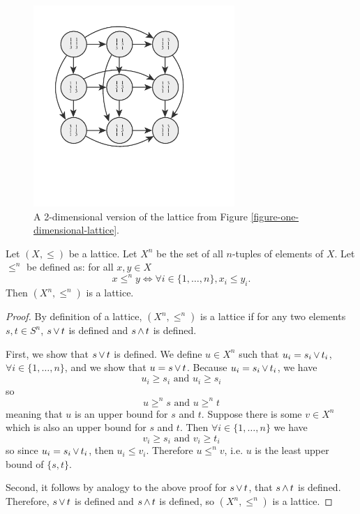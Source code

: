 	\begin{figure}[ht]
		\begin{center}
			\includegraphics[width=3in]{../figures/diagram6.pdf}
			\caption{A 2-dimensional version of the lattice from Figure \ref{figure-one-dimensional-lattice}.}
			\label{figure-two-dimensional-lattice}
		\end{center}
	\end{figure}

	\begin{proposition}
		\label{proposition-grid-is-lattice}
		Let $(X, \le)$ be a lattice. Let $X^n$ be the set of all $n$-tuples of elements of $X$. Let $\le^n$ be defined as: for all $x, y \in X$
		\[
			x \le^n y \iff \forall i \in \{1, \ldots, n\}, x_i \le y_i.
		\]
		Then $(X^n, \le^n)$ is a lattice.
	\end{proposition}

	\begin{proof}
		By definition of a lattice, $(X^n, \le^n)$ is a lattice if for any two elements $s, t \in S^n$, $s \operatorname{\vee} t$ is defined and $s \operatorname{\wedge} t$ is defined.

		First, we show that $s \operatorname{\vee} t$ is defined. We define $u \in X^n$ such that $u_i = s_i \operatorname{\vee} t_i$, $\forall i \in \{1, \ldots, n\}$, and we show that $u = s \operatorname{\vee} t$. Because $u_i = s_i \operatorname{\vee} t_i$, we have
		\[
			u_i \ge s_i \textrm{ and } u_i \ge s_i
		\]
		so
		\[
			u \ge^n s \textrm{ and } u \ge^n t
		\]
		meaning that $u$ is an upper bound for $s$ and $t$. Suppose there is some $v \in X^n$ which is also an upper bound for $s$ and $t$. Then $\forall i \in \{1, \ldots, n\}$ we have
		\[
			v_i \ge s_i \textrm{ and } v_i \ge t_i
		\]
		so since $u_i = s_i \operatorname{\vee} t_i$, then $u_i \le v_i$. Therefore $u \le^n v$, i.e. $u$ is the least upper bound of $\{s, t\}$.

		Second, it follows by analogy to the above proof for $s \operatorname{\vee} t$, that $s \operatorname{\wedge} t$ is defined. Therefore, $s \operatorname{\vee} t$ is defined and $s \operatorname{\wedge} t$ is defined, so $(X^n, \le^n)$ is a lattice.
	\end{proof}


